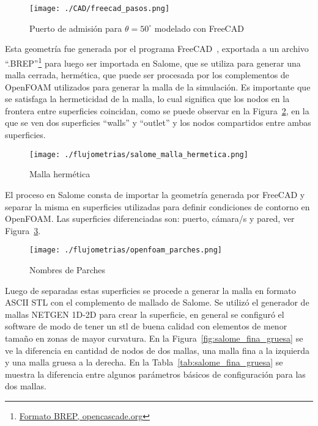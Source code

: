 \begin{figure}
    \centering
    \texttt{[image: ./CAD/freecad\_pasos.png]}
    \caption{Puerto de admisión para $\theta=50^{\circ}$ modelado con
FreeCAD}\label{fig:admision_50}
\end{figure}

Esta geometría fue generada por el programa FreeCAD~\parencite{freecad},
exportada a un archivo
``.BREP''\footnote{\href{https://dev.opencascade.org/doc/overview/html/specification\_\_brep\_format.html}{Formato
BREP, opencascade.org}} para luego ser importada en Salome\parencite{salome},
que se utiliza para generar una malla cerrada, hermética, que puede ser
procesada por los complementos de OpenFOAM utilizados para generar la malla de
la simulación.
%
Es importante que se satisfaga la hermeticidad de la malla, lo cual significa
que los nodos en la frontera entre superficies coincidan, como se puede observar
en la Figura~\ref{fig:salome_malla_hermetica}, en la que se ven dos superficies
``walls'' y ``outlet'' y los nodos compartidos entre ambas superficies.
%

\begin{figure}[ht]
    \centering
    \texttt{[image: ./flujometrias/salome\_malla\_hermetica.png]}
    \caption{Malla hermética}\label{fig:salome_malla_hermetica}
\end{figure}

El proceso en Salome consta de importar la geometría generada por FreeCAD y
separar la misma en superficies utilizadas para definir condiciones de contorno
en OpenFOAM.
%
Las superficies diferenciadas son: puerto, cámara/s y pared, ver
Figura~\ref{fig:openfoam_parches}.

\begin{figure}[ht]
    \centering
    \texttt{[image: ./flujometrias/openfoam\_parches.png]}
    \caption{Nombres de Parches}\label{fig:openfoam_parches}
\end{figure}

Luego de separadas estas superficies se procede a generar la malla en formato
ASCII STL con el complemento de mallado de Salome.
%
Se utilizó el generador de mallas NETGEN 1D-2D para crear la superficie, en
general se configuró el software de modo de tener un stl de buena calidad con
elementos de menor tamaño en zonas de mayor curvatura.
%
En la Figura~\ref{fig:salome_fina_gruesa} se ve la diferencia en cantidad de
nodos de dos mallas, una malla fina a la izquierda y una malla gruesa a la
derecha.
%
En la Tabla~\ref{tab:salome_fina_gruesa} se muestra la diferencia entre algunos
parámetros básicos de configuración para las dos mallas.
%


